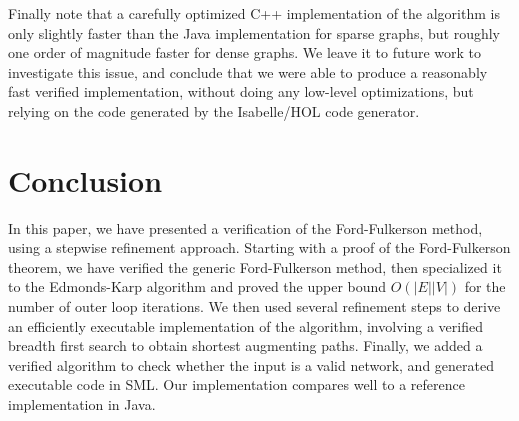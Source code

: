 \documentclass{llncs}
\begin{document}
  Finally note that a carefully optimized C++ implementation of the algorithm is only slightly faster than the Java implementation for sparse graphs,
  but roughly one order of magnitude faster for dense graphs. We leave it to future work to investigate this issue, and conclude that we were able to produce
  a reasonably fast verified implementation, without doing any low-level optimizations, but relying on the code generated by the Isabelle/HOL code generator.
  
% 
% 
    
    

\section{Conclusion}\label{sec:concl}
  In this paper, we have presented a verification of the Ford-Fulkerson method, using a stepwise refinement approach.
  Starting with a proof of the Ford-Fulkerson theorem, we have verified the generic Ford-Fulkerson method, then 
  specialized it to the Edmonds-Karp algorithm and proved the upper bound $O(|E||V|)$ for the number of outer loop iterations.
  We then used several refinement steps to derive an efficiently executable implementation of the algorithm, 
  involving a verified breadth first search to obtain shortest augmenting paths. 
  Finally, we added a verified algorithm to check whether the input is a valid network, and generated executable code in SML.
  Our implementation compares well to a reference implementation in Java.
  
\end{document}
